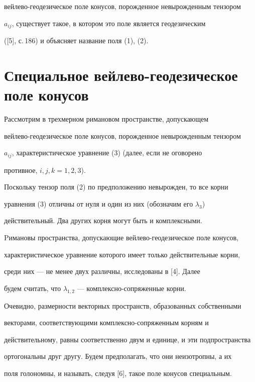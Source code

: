 вейлево-геодезическое поле конусов, порожденное невырожденным тензором 


$a_{ij}$, существует такое, в котором это поле является геодезическим 


([5], с.\,186) и объясняет название поля (1), (2). 


 


 


\section{Специальное вейлево-геодезическое поле конусов} 


 


Рассмотрим в трехмерном римановом пространстве, допускающем 


вейлево-геодезическое поле конусов, порожденное невырожденным тензором 


$a_{ij}$, характеристическое уравнение (3) (далее, если не оговорено 


противное, $i,j,k=1,2,3$). 


 


Поскольку тензор поля (2) по предположению невырожден, то все корни 


уравнения (3) отличны от нуля и один из них (обозначим его $\lambda_3$) 


действительный. Два других корня могут быть и комплексными. 


Pимановы пространства, допускающие вейлево-геодезическое поле конусов, 


характеристическое уравнение которого имеет только действительные корни, 


среди них --- не менее двух различны, исследованы в [4]. Далее


будем считать, что $\lambda_{1,2}$ --- комплексно-сопряженные корни. 


 


Очевидно, размерности векторных пространств, образованных собственными 


векторами, соответствующими комплексно-сопряженным корням и 


действительному, равны соответственно двум и единице, и эти подпространства 


ортогональны друг другу. Будем предполагать, что они неизотропны, а их 


поля голономны, и называть, следуя [6], такое поле конусов специальным. 


